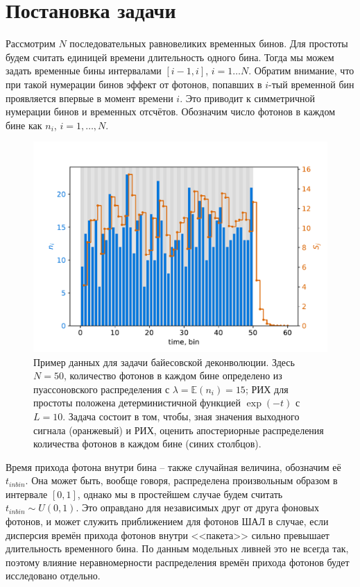 \documentclass[12pt]{article}
\begin{document}
	\section{Постановка задачи}
	
	Рассмотрим $N$ последовательных равновеликих временных бинов. Для простоты будем считать единицей времени длительность одного бина. Тогда мы можем задать временные бины интервалами $[i-1, i]$, $i = 1 \ldots N$. Обратим внимание, что при такой нумерации бинов эффект от фотонов, попавших в $i$-тый временной бин проявляется впервые в момент времени $i$. Это приводит к симметричной нумерации бинов и временных отсчётов. Обозначим число фотонов в каждом бине как $n_i$, $i = 1, \ldots, N$.

	\begin{figure}[H]
		\centering
		\includegraphics[width=\columnwidth]{problem-setup-example}
		\caption{Пример данных для задачи байесовской деконволюции. Здесь $N = 50$, количество фотонов в каждом бине определено из пуассоновского распределения с $\lambda = \mathbb{E}(n_i) = 15$; РИХ для простоты положена детерминистичной функцией $\exp(-t)$ с $L = 10$. Задача состоит в том, чтобы, зная значения выходного сигнала (оранжевый) и РИХ, оценить апостериорные распределения количества фотонов в каждом бине (синих столбцов).}
		\label{pic:problem-setup}
	\end{figure}

	Время прихода фотона внутри бина -- также случайная величина, обозначим её $t_{inbin}$. Она может быть, вообще говоря, распределена произвольным образом в интервале $[ 0, 1 ]$, однако мы в простейшем случае будем считать $t_{inbin} \sim U(0, 1)$. Это оправдано для независимых друг от друга фоновых фотонов, и может служить приближением для фотонов ШАЛ в случае, если дисперсия времён прихода фотонов внутри <<пакета>> сильно превышает длительность временного бина. По данным модельных ливней это не всегда так, поэтому влияние неравномерности распределения времён прихода фотонов будет исследовано отдельно.
\end{document}
